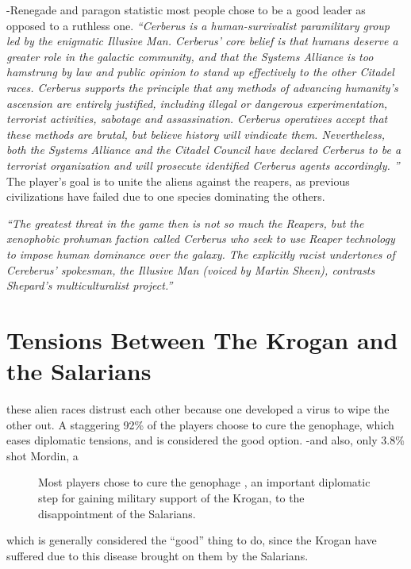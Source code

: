 \documentclass[journal]{IEEEtran}
\begin{document}
-Renegade and paragon statistic most people chose to be a good leader as opposed to a ruthless one.
\textit{``Cerberus is a human-survivalist paramilitary group led by the enigmatic Illusive Man. Cerberus' core belief is that humans deserve a greater role in the galactic community, and that the Systems Alliance is too hamstrung by law and public opinion to stand up effectively to the other Citadel races. Cerberus supports the principle that any methods of advancing humanity's ascension are entirely justified, including illegal or dangerous experimentation, terrorist activities, sabotage and assassination. Cerberus operatives accept that these methods are brutal, but believe history will vindicate them. Nevertheless, both the Systems Alliance and the Citadel Council have declared Cerberus to be a terrorist organization and will prosecute identified Cerberus agents accordingly. ''\cite{wikia}
}
The player's goal is to unite the aliens against the reapers, as
previous civilizations have failed due to one species dominating the others.


\textit{``The greatest threat in the game then is not so much the Reapers, but the xenophobic prohuman faction called Cerberus who seek to use Reaper technology to impose human dominance over the galaxy. The explicitly racist undertones of Cereberus’ spokesman, the Illusive Man (voiced by Martin Sheen), contrasts Shepard’s multiculturalist project.''\cite{chrisb}
}


\section{Tensions Between The Krogan and the Salarians}
these alien races distrust each other because one developed a virus to wipe the
other out. A staggering 92\% of the players choose to cure the genophage, which
eases diplomatic tensions, and is considered the good option. -and also,
only 3.8\% shot Mordin, a
\begin{figure}
 \begin{adjustbox}{width=.4\textwidth}
 \end{adjustbox}
 \caption{Most players chose to cure the genophage \cite{ea}, an important diplomatic step for gaining military support of the Krogan, to the disappointment of the Salarians.}
\end{figure}
which is generally considered the ``good'' thing to do, since the Krogan have suffered due to this disease brought on them by the Salarians.
\end{document}

